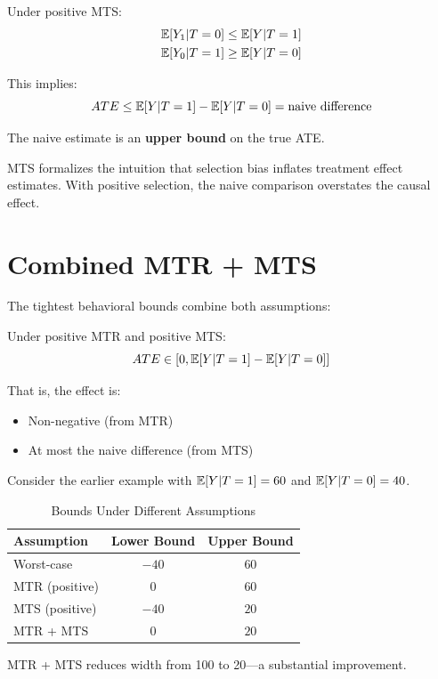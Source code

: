 \begin{theorem}
\label{thm:mts_bounds}
Under positive MTS:
\begin{align*}
\mathbb{E}[Y_1 | T = 0] &\leq \mathbb{E}[Y | T = 1] \\
\mathbb{E}[Y_0 | T = 1] &\geq \mathbb{E}[Y | T = 0]
\end{align*}

This implies:
\[
ATE \leq \mathbb{E}[Y|T=1] - \mathbb{E}[Y|T=0] = \text{naive difference}
\]

The naive estimate is an \textbf{upper bound} on the true ATE.
\end{theorem}

\begin{insight}
MTS formalizes the intuition that selection bias inflates treatment effect estimates. With positive selection, the naive comparison overstates the causal effect.
\end{insight}


\section{Combined MTR + MTS}
\label{sec:mtr_mts}

The tightest behavioral bounds combine both assumptions:

\begin{theorem}
\label{thm:mtr_mts}
Under positive MTR and positive MTS:
\[
ATE \in [0, \mathbb{E}[Y|T=1] - \mathbb{E}[Y|T=0]]
\]

That is, the effect is:
\begin{itemize}
    \item Non-negative (from MTR)
    \item At most the naive difference (from MTS)
\end{itemize}
\end{theorem}

\begin{example}
Consider the earlier example with $\mathbb{E}[Y|T=1] = 60$ and $\mathbb{E}[Y|T=0] = 40$.

\begin{table}[htbp]
\centering
\caption{Bounds Under Different Assumptions}
\label{tab:bounds_comparison}
\begin{tabular}{lcc}
\toprule
Assumption & Lower Bound & Upper Bound \\
\midrule
Worst-case & $-40$ & $60$ \\
MTR (positive) & $0$ & $60$ \\
MTS (positive) & $-40$ & $20$ \\
MTR + MTS & $0$ & $20$ \\
\bottomrule
\end{tabular}
\end{table}

MTR + MTS reduces width from 100 to 20---a substantial improvement.
\end{example}


